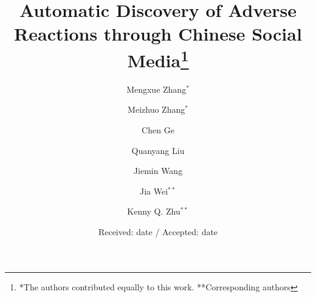 \documentclass[smallextended]{svjour3}       %
\begin{document}
\title{Automatic Discovery of Adverse Reactions through Chinese Social Media\thanks{*The authors contributed equally to this work.      **Corresponding authors}
}


\author{Mengxue Zhang$^{*}$\and
        Meizhuo Zhang$^{*}$\and
        Chen Ge\and
        Quanyang Liu\and
        Jiemin Wang\and
        Jia Wei$^{**}$\and
        Kenny Q. Zhu$^{**}$ %
}



\date{Received: date / Accepted: date}
\end{document}
